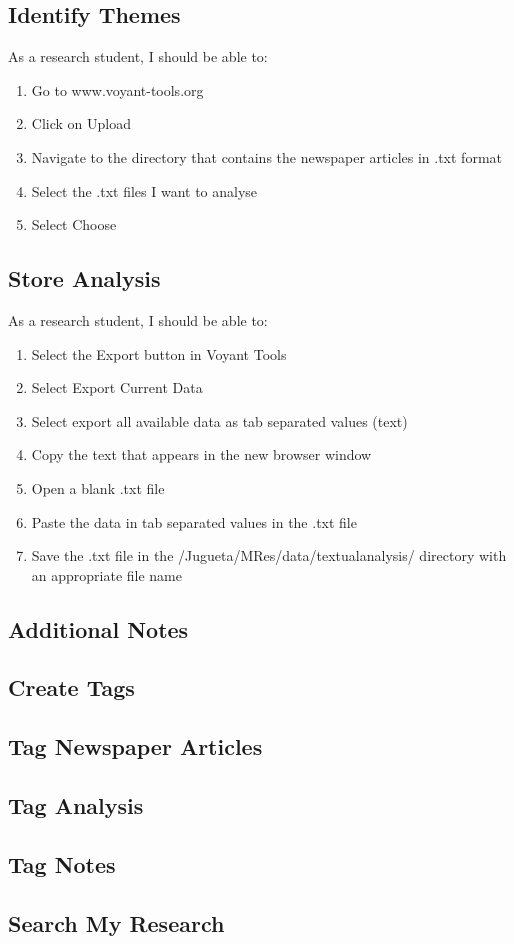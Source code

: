 \documentclass{article}
\begin{document}
\subsection*{Identify Themes}

As a research student, I should be able to:
\begin{enumerate}
    \item Go to www.voyant-tools.org
    \item Click on Upload
    \item Navigate to the directory that contains the newspaper articles in .txt format
    \item Select the .txt files I want to analyse
    \item Select Choose
\end{enumerate}

\subsection*{Store Analysis}

As a research student, I should be able to:
\begin{enumerate}
    \item Select the Export button in Voyant Tools
    \item Select Export Current Data
    \item Select export all available data as tab separated values (text)
    \item Copy the text that appears in the new browser window
    \item Open a blank .txt file
    \item Paste the data in tab separated values in the .txt file
    \item Save the .txt file in the /Jugueta/MRes/data/textualanalysis/ directory with an appropriate file name
\end{enumerate}

\subsection*{Additional Notes}



\subsection*{Create Tags}



\subsection*{Tag Newspaper Articles}



\subsection*{Tag Analysis}



\subsection*{Tag Notes}



\subsection*{Search My Research}
\end{document}
